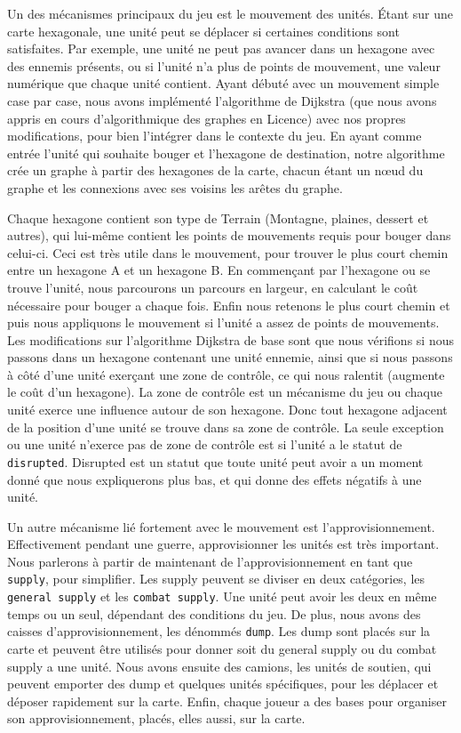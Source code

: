 Un des mécanismes principaux du jeu est le mouvement des unités.
Étant sur une carte hexagonale, une unité peut se déplacer si certaines conditions sont satisfaites.
Par exemple, une unité ne peut pas avancer dans un hexagone avec des ennemis présents, ou si l'unité n'a plus de
points de mouvement, une valeur numérique que chaque unité contient. Ayant débuté avec un mouvement simple case
par case, nous avons implémenté l'algorithme de Dijkstra (que nous avons appris en cours d'algorithmique des graphes en Licence) 
avec nos propres modifications, pour bien l'intégrer dans
le contexte du jeu. En ayant comme entrée l'unité qui souhaite bouger et l'hexagone de destination, notre algorithme
crée un graphe à partir des hexagones de la carte, chacun étant un nœud du graphe et les connexions avec ses voisins
les arêtes du graphe.

Chaque hexagone contient son type de Terrain (Montagne, plaines, dessert et autres), qui lui-même contient les points
de mouvements requis pour bouger dans celui-ci. Ceci est très utile dans le mouvement, pour trouver le plus court
chemin entre un hexagone A et un hexagone B. En commençant par l'hexagone ou se trouve l'unité, nous parcourons un
parcours en largeur, en calculant le coût nécessaire pour bouger a chaque fois. Enfin nous retenons le plus court
chemin et puis nous appliquons le mouvement si l'unité a assez de points de mouvements. Les modifications sur
l'algorithme Dijkstra de base sont que nous vérifions si nous passons dans un hexagone contenant une unité ennemie,
ainsi que si nous passons à côté d'une unité exerçant une zone de contrôle, ce qui nous ralentit (augmente le coût
d'un hexagone). La zone de contrôle est un mécanisme du jeu ou chaque unité exerce une influence autour de son
hexagone. Donc tout hexagone adjacent de la position d'une unité se trouve dans sa zone de contrôle.
La seule exception ou une unité n'exerce pas de zone de contrôle est si l'unité a le statut de {\tt disrupted}.
Disrupted est un statut que toute unité peut avoir a un moment donné que nous expliquerons plus bas, et qui donne
des effets négatifs à une unité.

Un autre mécanisme lié fortement avec le mouvement est l'approvisionnement. Effectivement pendant une guerre,
approvisionner les unités est très important. Nous parlerons à partir de maintenant de l'approvisionnement en
tant que {\tt supply}, pour simplifier. Les supply peuvent se diviser en deux catégories, les {\tt general supply} et les
{\tt combat supply}. Une unité peut avoir les deux en même temps ou un seul, dépendant des conditions du jeu. De plus,
nous avons des caisses d'approvisionnement, les dénommés {\tt dump}. Les dump sont placés sur la carte et peuvent
être utilisés pour donner soit du general supply ou du combat supply a une unité. Nous avons ensuite des camions,
les unités de soutien, qui peuvent emporter des dump et quelques unités spécifiques, pour les déplacer et déposer
rapidement sur la carte. Enfin, chaque joueur a des bases pour organiser son approvisionnement, placés, elles aussi,
sur la carte.

